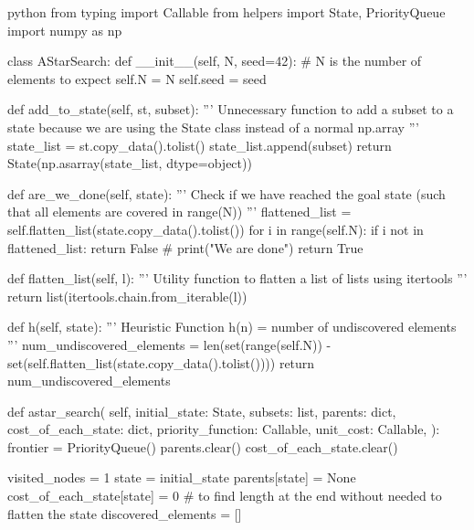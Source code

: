 \begin{mintedbox}{python}
  from typing import Callable
  from helpers import State, PriorityQueue
  import numpy as np

  class AStarSearch:
      def __init__(self, N, seed=42):
          # N is the number of elements to expect
          self.N = N
          self.seed = seed

      def add_to_state(self, st, subset):
          '''
          Unnecessary function to add a subset to a state because we are using the State class instead of a normal np.array
          '''
          state_list = st.copy_data().tolist()
          state_list.append(subset)
          return State(np.asarray(state_list, dtype=object))

      def are_we_done(self, state):
          '''
          Check if we have reached the goal state (such that all elements are covered in range(N))
          '''
          flattened_list = self.flatten_list(state.copy_data().tolist())
          for i in range(self.N):
              if i not in flattened_list:
                  return False
          # print("We are done")
          return True

      def flatten_list(self, l):
          '''
          Utility function to flatten a list of lists using itertools
          '''
          return list(itertools.chain.from_iterable(l))

      def h(self, state):
          '''
          Heuristic Function h(n) = number of undiscovered elements
          '''
          num_undiscovered_elements = len(set(range(self.N)) - set(self.flatten_list(state.copy_data().tolist())))
          return num_undiscovered_elements

      def astar_search(
          self,
          initial_state: State,
          subsets: list,
          parents: dict,
          cost_of_each_state: dict,
          priority_function: Callable,
          unit_cost: Callable,
      ):
          frontier = PriorityQueue()
          parents.clear()
          cost_of_each_state.clear()

          visited_nodes = 1
          state = initial_state
          parents[state] = None
          cost_of_each_state[state] = 0
          # to find length at the end without needed to flatten the state
          discovered_elements = []


\end{mintedbox}
